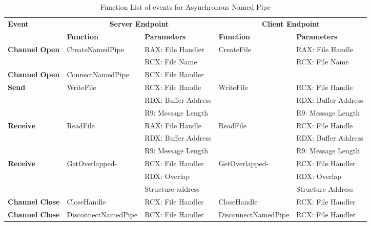     \begin{table}[H]
        \centering
        \small
        \caption{Function List  of events for Asynchronous Named Pipe}
        \label{asynfunctions}
        \begin{tabular}{|l|l|l|l|l|}
            \hline
             \multirow{2}{*}{\textbf{Event}} &
               \multicolumn{2}{c|}{\textbf{Server Endpoint}} &
               \multicolumn{2}{c|}{\textbf{Client Endpoint}} \\
             \cline{2-5}
              & \textbf{Function}& \textbf{Parameters} & \textbf{Function} & \textbf{Parameters}  \\
             \hline
             \multirow{2}{*}{{\textbf{Channel Open}}}
             &\multirow{2}{*}{{CreateNamedPipe}} &  RAX: File Handler & \multirow{2}{*}{CreateFile} &  RAX: File Handle\\
              \cline{3-3} \cline{5-5}
             &&  RCX: File Name &  &  RCX: File Name\\
            \hline
            {{\textbf{Channel Open}}}
             &{ConnectNamedPipe} & {RCX: File Handler} & & \\
            \hline
             \multirow{3}{*}{{\textbf{Send}}}
             &\multirow{3}{*}{WriteFile} &  RCX: File Handle & \multirow{3}{*}{WriteFile} &  RCX: File Handle\\
              \cline{3-3} \cline{5-5}
             &&  RDX: Buffer Address &  &  RDX: Buffer Address\\
                           \cline{3-3} \cline{5-5}
             & &  R9: Message Length &  &  R9: Message Length\\
            \hline
            \multirow{3}{*}{{\textbf{Receive}}}
             & \multirow{3}{*}{ReadFile}&  RAX: File Handle & \multirow{3}{*}{ReadFile} &  RCX: File Handle\\
              \cline{3-3} \cline{5-5}
              &&  RDX: Buffer Address &  &  RDX: Buffer Address\\
                           \cline{3-3} \cline{5-5}
             & &  R9: Message Length &  &  R9: Message Length\\
              \hline
               \multirow{2}{*}{{\textbf{Receive}}}
             & \multirow{2}{*}{GetOverlapped-}&  RCX: File Handler & \multirow{2}{*}{GetOverlapped-} &  RCX: File Handler\\
              \cline{3-3} \cline{5-5}
             &  \multirow{2}{*}{Result} &  RDX:  Overlap  &  \multirow{2}{*}{Result }&  RDX:  Overlap \\
              &  &  Structure address &  &  Structure Address\\
            \hline                       
            \textbf{Channel Close}
             &{CloseHandle} &{RCX: File Handler} & {CloseHandle} &  {RCX: File Handler}\\
            \hline
           {{\textbf{Channel Close}}}
             &{DisconnectNamedPipe} & {RCX: File Handler} & {DisconnectNamedPipe} & {RCX: File Handler}\\
            \hline
        \end{tabular}
    \end{table}



